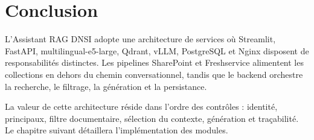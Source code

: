 \section{Conclusion}

L'Assistant RAG DNSI adopte une architecture de services où Streamlit, FastAPI, multilingual-e5-large, Qdrant, vLLM, PostgreSQL et Nginx disposent de responsabilités distinctes. Les pipelines SharePoint et Freshservice alimentent les collections en dehors du chemin conversationnel, tandis que le backend orchestre la recherche, le filtrage, la génération et la persistance.

La valeur de cette architecture réside dans l'ordre des contrôles : identité, principaux, filtre documentaire, sélection du contexte, génération et traçabilité. Le chapitre suivant détaillera l'implémentation des modules.
